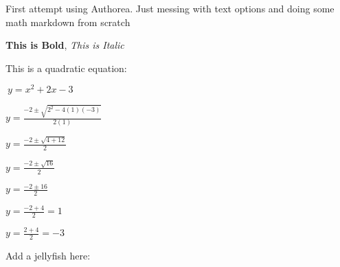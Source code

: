 First attempt using Authorea. Just messing with text options and doing some math markdown from scratch

\textbf{This is Bold}, \textit{This is Italic}

This is a quadratic equation:

$\ y = x^{2} + 2x -3 $


$ y = \frac{-2 \pm \sqrt{2^{2}-4(1)(-3)}}{2(1)}$

$ y = \frac{-2 \pm \sqrt{4+12}}{2}$

$ y = \frac{-2 \pm \sqrt{16}}{2}$

$ y = \frac{-2 \pm {16}}{2}$

$ y = \frac{-2 + {4}}{2} = 1$

$ y = \frac{2 + {4}}{2} = -3$


Add a jellyfish here:
